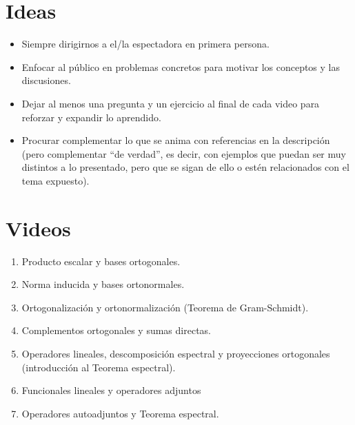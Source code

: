 \documentclass[12pt,dvipsnames]{article}
\numberwithin{equation}{section}
\begin{document}
\newpage
\section{Ideas}

\begin{itemize}
    \item Siempre dirigirnos a el/la espectadora en primera persona.
    \item Enfocar al público en problemas concretos para motivar los conceptos y las discusiones.
    \item Dejar al menos una pregunta y un ejercicio al final de cada video para reforzar y expandir lo aprendido.
    \item Procurar complementar lo que se anima con referencias en la descripción (pero complementar ``de verdad'', es decir, con ejemplos que puedan ser muy distintos a lo presentado, pero que se sigan de ello o estén relacionados con el tema expuesto).
\end{itemize}

\section{Videos}

\begin{enumerate}
    \item Producto escalar y bases ortogonales.
    \item Norma inducida y bases ortonormales.
    \item Ortogonalización y ortonormalización (Teorema de Gram-Schmidt).
    \item Complementos ortogonales y sumas directas.
    \item Operadores lineales, descomposición espectral y proyecciones ortogonales (introducción al Teorema espectral).
    \item Funcionales lineales y operadores adjuntos
    \item Operadores autoadjuntos y Teorema espectral.
\end{enumerate}
\end{document}

